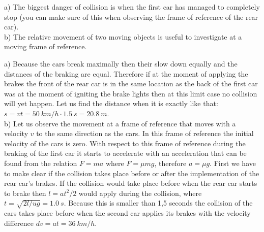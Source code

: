 \hinteng
a) The biggest danger of collision is when the first car has managed to completely stop (you can make sure of this when observing the frame of reference of the rear car).\\
b) The relative movement of two moving objects is useful to investigate at a moving frame of reference.

\solueng
a) Because the cars break maximally then their slow down equally and the distances of the braking are equal. Therefore if at the moment of applying the brakes the front of the rear car is in the same location as the back of the first car was at the moment of igniting the brake lights then at this limit case no collision will yet happen. Let us find the distance when it is exactly like that: $s=vt=\SI{50}{km/h}\cdot\SI{1,5}{s}=\SI{20,8}{m}$.\\
b) Let us observe the movement at a frame of reference that moves with a velocity $v$ to the same direction as the cars. In this frame of reference the initial velocity of the cars is zero. With respect to this frame of reference during the braking of the first car it starts to accelerate with an acceleration that can be found from the relation $F=ma$ where $F=\mu mg$, therefore $a=\mu g$. First we have to make clear if the collision takes place before or after the implementation of the rear car’s brakes. If the collision would take place before when the rear car starts to brake then $l=at^2/2$ would apply during the collision, where $t=\sqrt{2l/ug}=\SI{1.0}{s}$. Because this is smaller than 1,5 seconds the collision of the cars takes place before when the second car applies its brakes with the velocity difference $dv=at=\SI{36}{km/h}$.
\probend